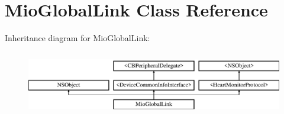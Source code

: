 \hypertarget{interface_mio_global_link}{\section{Mio\-Global\-Link Class Reference}
\label{interface_mio_global_link}
}
Inheritance diagram for Mio\-Global\-Link\-:\begin{figure}[H]
\begin{center}
\leavevmode
\includegraphics[height=2.901554cm]{interface_mio_global_link}
\end{center}
\end{figure}
